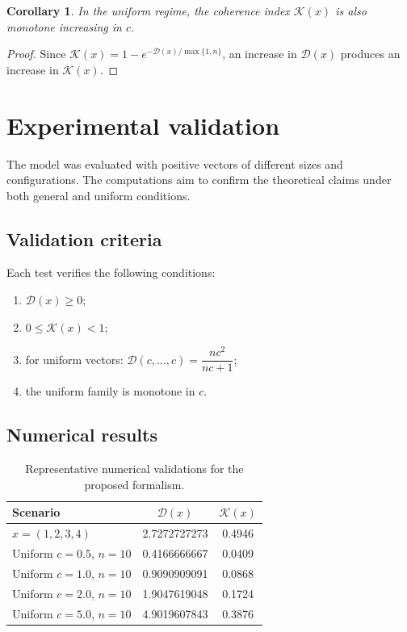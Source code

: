\documentclass[11pt]{article}
\newtheorem{corollary}{Corollary}
\begin{document}
\begin{corollary}
In the uniform regime, the coherence index $\mathcal{K}(x)$ is also monotone increasing in $c$.
\end{corollary}
\begin{proof}
Since $\mathcal{K}(x)=1-e^{-\mathcal{D}(x)/\max\{1,n\}}$, an increase in $\mathcal{D}(x)$ produces an increase in $\mathcal{K}(x)$.
\end{proof}

\section{Experimental validation}
The model was evaluated with positive vectors of different sizes and configurations. The computations aim to confirm the theoretical claims under both general and uniform conditions.

\subsection{Validation criteria}
Each test verifies the following conditions:
\begin{enumerate}[label=\arabic*.]
\item $\mathcal{D}(x)\ge 0$;
\item $0\le \mathcal{K}(x)<1$;
\item for uniform vectors: $\mathcal{D}(c,\ldots,c)=\dfrac{nc^2}{nc+1}$;
\item the uniform family is monotone in $c$.
\end{enumerate}

\subsection{Numerical results}
\begin{table}[h!]
\centering
\begin{tabular}{lcc}
\toprule
Scenario & $\mathcal{D}(x)$ & $\mathcal{K}(x)$ \\
\midrule
$x=(1,2,3,4)$ & 2.7272727273 & 0.4946 \\
Uniform $c=0.5$, $n=10$ & 0.4166666667 & 0.0409 \\
Uniform $c=1.0$, $n=10$ & 0.9090909091 & 0.0868 \\
Uniform $c=2.0$, $n=10$ & 1.9047619048 & 0.1724 \\
Uniform $c=5.0$, $n=10$ & 4.9019607843 & 0.3876 \\
\bottomrule
\end{tabular}
\caption{Representative numerical validations for the proposed formalism.}
\end{table}
\end{document}
